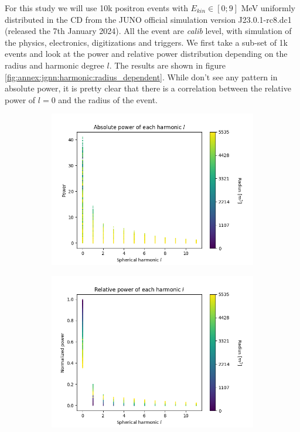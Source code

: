 \documentclass[../main.tex]{subfiles}
\begin{document}
For this study we will use 10k positron events with $E_{kin} \in [0; 9]$ MeV uniformly distributed in the CD from the JUNO official simulation version J23.0.1-rc8.dc1 (released the 7th January 2024). All the event are \textit{calib} level, with simulation of the physics, electronics, digitizations and triggers. We first take a sub-set of 1k events and look at the power and relative power distribution depending on the radius and harmonic degree $l$. The results are shown in figure \ref{fig:annex:jgnn:harmonic:radius_dependent}. While don't see any pattern in absolute power, it is pretty clear that there is a correlation between the relative power of $l=0$ and the radius of the event.

\begin{figure}[ht]
  \centering
  \begin{subfigure}[t]{0.48\linewidth}
    \includegraphics[width=\linewidth]{images/jgnn/harmonic/abs_power_radius_dependency.png}
  \end{subfigure}
  \hfill
  \begin{subfigure}[t]{0.48\linewidth}
    \includegraphics[width=\linewidth]{images/jgnn/harmonic/power_radius_dependency.png}

\end{subfigure}
\end{figure}
\end{document}

